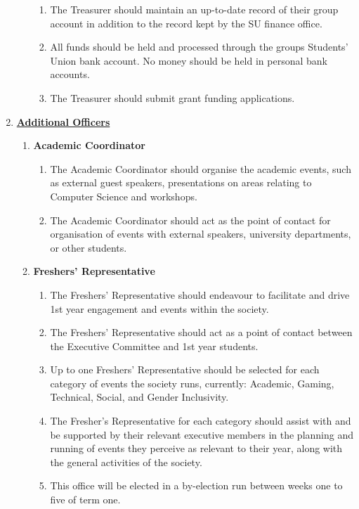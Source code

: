 \documentclass{article}
\begin{document}
\begin{enumerate}
\begin{enumerate}
\begin{enumerate}
            \item The Treasurer should maintain an up-to-date record of their group account in addition to the record kept by the SU finance office.
            \item All funds should be held and processed through the groups Students’ Union bank account. No money should be held in personal bank accounts.
            \item The Treasurer should submit grant funding applications.
        \end{enumerate}
    \end{enumerate}
    \item \textbf{\underline{Additional Officers}}
    \begin{enumerate}
        \item \textbf{Academic Coordinator}
        \begin{enumerate}
            \item The Academic Coordinator should organise the academic events, such as external guest speakers, presentations on areas relating to Computer Science and workshops.
            \item The Academic Coordinator should act as the point of contact for organisation of events with external speakers, university departments, or other students.
        \end{enumerate}
        \item \textbf{Freshers' Representative}
        \begin{enumerate}
            \item The Freshers’ Representative should endeavour to facilitate and drive 1st year engagement and events within the society.
            \item The Freshers’ Representative should act as a point of contact between the Executive Committee and 1st year students.
            \item Up to one Freshers’ Representative should be selected for each category of events the society runs, currently: Academic, Gaming, Technical, Social, and Gender Inclusivity. 
            \item The Fresher’s Representative for each category should assist with and be supported by their relevant executive members in the planning and running of events they perceive as relevant to their year, along with the general activities of the society.
            \item This office will be elected in a by-election run between weeks one to five of term one.

\end{enumerate}
\end{enumerate}
\end{enumerate}
\end{document}
